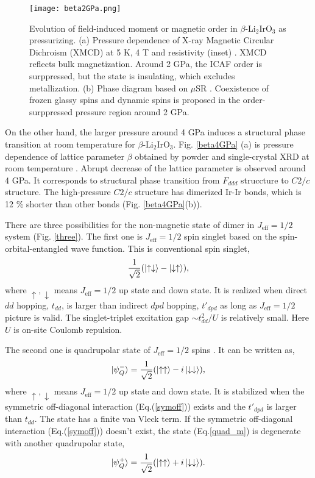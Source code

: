 \documentclass[a4,10.5pt]{report}
\begin{document}
\begin{figure}
  \centering
  \texttt{[image: beta2GPa.png]}
  \caption{Evolution of field-induced moment or magnetic order in $\beta$-Li$_2$IrO$_3$ as pressurizing.
  (a) Pressure dependence of X-ray Magnetic Circular Dichroism (XMCD) at 5 K, 4 T and resistivity (inset) \cite{takayama2015hyperhoneycomb}.
  XMCD reflects bulk magnetization.
  Around 2 GPa, the ICAF order is surppressed, but the state is insulating, which excludes metallization.
  (b) Phase diagram based on $\mu$SR \cite{Majumder2018}.
  Coexistence of frozen glassy spins and dynamic spins is proposed in the order-surppressed pressure region around 2 GPa.}
  \label{beta2GPa}
\end{figure}

On the other hand, the larger pressure around 4 GPa induces a structural phase transition at room temperature for $\beta$-Li$_2$IrO$_3$.
Fig. \ref{beta4GPa} (a) is pressure dependence of lattice parameter $\beta$ obtained by powder and single-crystal XRD at room temperature \cite{veiga2017pressure}.
Abrupt decrease of the lattice parameter is observed around 4 GPa.
It corresponds to structural phase transition from $F_{ddd}$ struccture to $C2/c$ structure. 
The high-pressure $C2/c$ structure has dimerized Ir-Ir bonds, which is 12 \% shorter than other bonds (Fig. \ref{beta4GPa}(b)). 

There are three possibilities for the non-magnetic state of dimer in $J_{\mathrm{eff}} = 1/2$ system (Fig. \ref{three}). 
The first one is $J_{\mathrm{eff}} = 1/2$ spin singlet based on the spin-orbital-entangled wave function.
This is conventional spin singlet, 
\begin{equation}
\frac{1}{\sqrt{2}}(\ket{\uparrow\downarrow}-\ket{\downarrow\uparrow}),
\end{equation}
where $\uparrow, \downarrow$ means $J_{\mathrm{eff}} = 1/2$ up state and down state.
It is realized when direct $dd$ hopping, $t_{dd}$, is larger than indirect $dpd$ hopping, $t'_{dpd}$ 
as long as $J_{\mathrm{eff}} = 1/2$ picture is valid.
The singlet-triplet excitation gap $\sim t^2_{dd}/U$ is relatively small.
Here $U$ is on-site Coulomb repulsion.

The second one is quadrupolar state of $J_{\mathrm{eff}} = 1/2$ spins \cite{Nasu2014}. 
It can be written as,
\begin{equation}
\ket{\psi^-_Q} = \frac{1}{\sqrt{2}}(\ket{\uparrow\uparrow}-i\ket{\downarrow\downarrow}),
\label{quad_m}
\end{equation}
where $\uparrow, \downarrow$ means $J_{\mathrm{eff}} = 1/2$ up state and down state.
It is stabilized when the symmetric off-diagonal interaction (Eq.(\ref{symoff})) exists and the $t'_{dpd}$ is larger than $t_{dd}$.
The state has a finite van Vleck term.
If the symmetric off-diagonal interaction (Eq.(\ref{symoff})) doesn't exist, the state (Eq.\ref{quad_m}) is degenerate with another quadrupolar state,
\begin{equation}
\ket{\psi^+_Q} = \frac{1}{\sqrt{2}}(\ket{\uparrow\uparrow}+i\ket{\downarrow\downarrow}).
\label{quad_p}
\end{equation}
\end{document}
